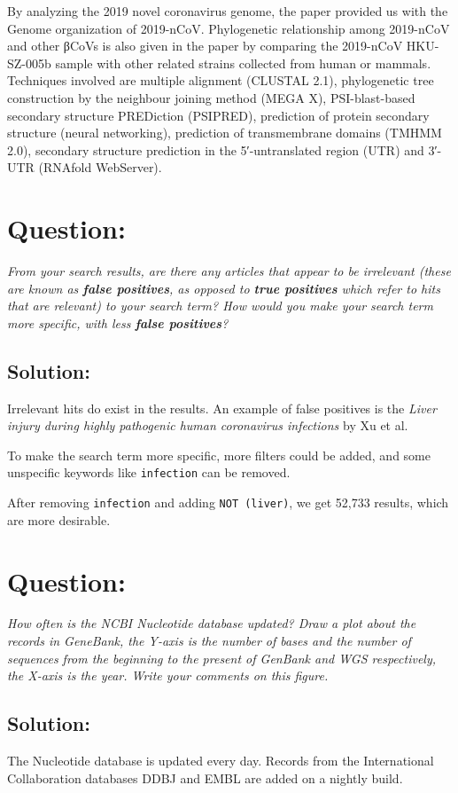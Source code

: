 \documentclass[en,black,12pt,normal]{elegantnote}
\newcommand{\upcite}[1]{\textsuperscript{\textsuperscript{\cite{#1}}}}
\begin{document}
By analyzing the 2019 novel coronavirus genome, the paper provided us with the Genome organization of 2019-nCoV. Phylogenetic relationship among 2019-nCoV and other βCoVs is also given in the paper
by comparing the 2019-nCoV HKU-SZ-005b sample with other related strains collected from human or mammals. Techniques involved are multiple alignment (CLUSTAL 2.1), 
phylogenetic tree construction by the neighbour joining method (MEGA X), PSI-blast-based secondary structure PREDiction (PSIPRED), 
prediction of protein secondary structure (neural networking),
prediction of transmembrane domains (TMHMM 2.0),
secondary structure prediction in the 5′-untranslated region (UTR) and 3′-UTR (RNAfold WebServer).

\section{Question:}
\textit{From your search results, are there any articles that appear to be irrelevant (these are known as \textbf{false positives}, as opposed to \textbf{true positives} which refer to hits that are relevant) to your search term? How would you make your search term more specific, with less \textbf{false positives}?}

\subsection*{Solution:}
Irrelevant hits do exist in the results. An example of false positives is the \textit{Liver injury during highly pathogenic human coronavirus infections}\upcite{xu2020liver} by Xu et al.

To make the search term more specific, more filters could be added, and some unspecific keywords like \texttt{infection} can be removed.

After removing \texttt{infection} and adding \texttt{NOT (liver)}, we get 52,733 results, which are more desirable.

\section{Question:}
\textit{How often is the NCBI Nucleotide database updated? Draw a plot about the records in GeneBank, the Y-axis is the number of bases and the number of sequences from the beginning to the present of GenBank and WGS respectively, the X-axis is the year. Write your comments on this figure.}

\subsection*{Solution:}
The Nucleotide database is updated every day. Records from the International Collaboration databases DDBJ and EMBL are added on a nightly build. 
\end{document}
